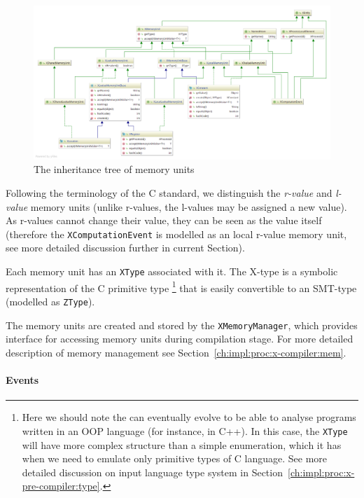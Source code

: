 \begin{figure}[t]%
  \centering
  \includegraphics[width=\textwidth,height=\textheight,keepaspectratio]{img/my/class-diagrams/XMemoryUnit-m.png}
  \caption{The inheritance tree of \xgraph{} memory units}
  \label{fig:class-diagrams:XMemoryUnit}
\end{figure}

Following the terminology of the C standard, we distinguish the \textit{r-value} and \textit{l-value} memory units (unlike r-values, the l-values may be assigned a new value).
As r-values cannot change their value, they can be seen as the value itself (therefore the \texttt{XComputationEvent} is modelled as an local r-value memory unit, see more detailed discussion further in current Section).

Each memory unit has an \texttt{XType} associated with it.
The X-type is a symbolic representation of the C primitive type%
\footnote{Here we should note the \porthos[2] can eventually evolve to be able to analyse programs written in an OOP language (for instance, in C++). In this case, the \texttt{XType} will have more complex structure than a simple enumeration, which it has when we need to emulate only primitive types of C language. See more detailed discussion on input language type system in Section~\ref{ch:impl:proc:x-pre-compiler:type}.} %
that is easily convertible to an SMT-type (modelled as \texttt{ZType}).%

The memory units are created and stored by the \texttt{XMemoryManager}, which provides interface for accessing memory units during compilation stage.
For more detailed description of memory management see Section~\ref{ch:impl:proc:x-compiler:mem}.


\paragraph{Events}
\label{ch:impl:model:xgraph:evt}

